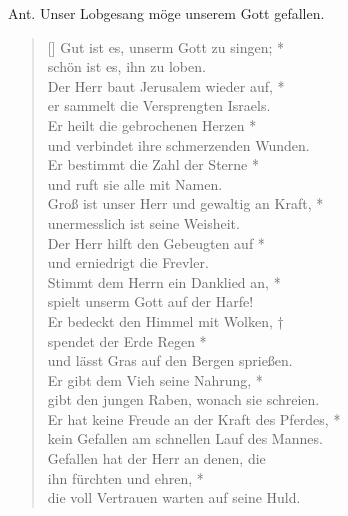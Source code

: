 \def\greinitialformat#1{{\fontsize{40}{40}\selectfont #1}}
\gresetfirstlineaboveinitial{\small \textcolor{red}{Ps 147a}}{}
\setaboveinitialseparation{0.72mm}

Ant. Unser Lobgesang möge unserem Gott gefallen.

\vspace{0.3cm}


\begin{verse}[\versewidth]
 Gut ist es, unserm Gott zu singen; *\\
schön ist es, ihn zu loben. \\
\vin Der Herr baut Jerusalem wieder auf, *\\
\vin er sammelt die Versprengten Israels. \\
Er heilt die gebrochenen Herzen *\\
und verbindet ihre schmerzenden Wunden. \\
\vin Er bestimmt die Zahl der Sterne *\\
\vin und ruft sie alle mit Namen. \\
Groß ist unser Herr und gewaltig an Kraft, *\\
unermesslich ist seine Weisheit. \\
\vin Der Herr hilft den Gebeugten auf *\\
\vin und erniedrigt die Frevler.\\
Stimmt dem Herrn ein Danklied an, *\\
spielt unserm Gott auf der Harfe!\\
\vin Er bedeckt den Himmel mit Wolken, †\\
\vin spendet der Erde Regen *\\
 \vin und lässt Gras auf den Bergen sprießen. \\
Er gibt dem Vieh seine Nahrung, *\\
gibt den jungen Raben, wonach sie schreien. \\
\vin Er hat keine Freude an der Kraft des Pferdes, *\\
\vin kein Gefallen am schnellen Lauf des Mannes. \\
Gefallen hat der Herr an denen, die \\ ihn fürchten und ehren, *\\
die voll Vertrauen warten auf seine Huld.\\
\end{verse}



